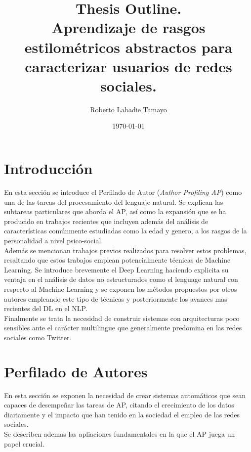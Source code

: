 \documentclass[11pt]{article}
\title{Thesis Outline. \\
	
	Aprendizaje de rasgos estilométricos abstractos para caracterizar usuarios de redes sociales.\\}
\author{Roberto Labadie Tamayo}
\date{\today}
\begin{document}
	\maketitle 	
	
	\section*{Introducción}
		En esta sección se introduce el Perfilado de Autor (\textit{Author Profiling AP}) como una de las tareas del procesamiento del lenguaje natural. Se explican las subtareas particulares que aborda el AP, así como la expansión que se ha producido en trabajos recientes que incluyen además del análisis de características comúnmente estudiadas como la edad y genero, a los rasgos de la personalidad a nivel psico-social.\\
		Además se mencionan trabajos previos realizados para resolver estos problemas, resaltando que estos trabajos emplean potencialmente técnicas de Machine Learning. Se introduce brevemente el Deep Learning haciendo explicita su ventaja en el análisis de datos no estructurados como el lenguage natural con respecto al Machine Learning y se exponen los métodos propuestos por otros autores empleando este tipo de técnicas y posteriormente los avances mas recientes del DL en el NLP.\\
		Finalmente se trata la necesidad de construir sistemas con arquitecturas poco sensibles ante el carácter multilingue que generalmente predomina en las redes sociales como Twitter.
		
		
		
		
		
	\section{Perfilado de Autores}
	
		
		En esta sección se exponen la necesidad de crear sistemas automáticos que sean capaces de desempeñar las tareas de AP, citando el crecimiento de los datos diariamente y el impacto que han tenido en la sociedad el empleo de las redes sociales.\\
		Se describen ademas las apliaciones fundamentales en la que el AP juega un papel crucial.
	
\end{document}
